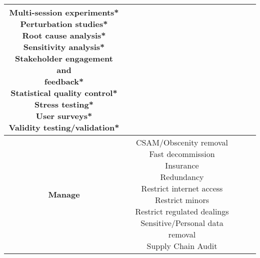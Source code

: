 \documentclass[fleqn]{article}
\begin{document}
\begin{landscape}
\begin{table}[H]
\begin{tabular}{|c|c|c|c|}
{			\textbullet\hspace{3pt} Multi-session experiments*\\  		
			\textbullet\hspace{3pt} Perturbation studies*\\  				
			\textbullet\hspace{3pt} Root cause analysis*\\  	
			\textbullet\hspace{3pt} Sensitivity analysis*\\  	
			\textbullet\hspace{3pt} Stakeholder engagement and \\\hspace{10pt}feedback*\\  	
			\textbullet\hspace{3pt} Statistical quality control*\\  	
			\textbullet\hspace{3pt} Stress testing*\\  		
			\textbullet\hspace{3pt} User surveys*\\  	
			\textbullet\hspace{3pt} Validity testing/validation*\\ 
		}
		\\
		\hline		
		\textbf{Manage} & \makecell[l]{	
			\textbullet\hspace{3pt} CSAM/Obscenity removal \\ 	
			\textbullet\hspace{3pt} Fast decommission \\ 	
			\textbullet\hspace{3pt} Insurance \\ 	
			\textbullet\hspace{3pt} Redundancy \\ 	
			\textbullet\hspace{3pt} Restrict internet access \\ 	
			\textbullet\hspace{3pt} Restrict minors \\ 	
			\textbullet\hspace{3pt} Restrict regulated dealings \\ 	
			\textbullet\hspace{3pt} Sensitive/Personal data removal \\ 	
			\textbullet\hspace{3pt} Supply Chain Audit \\ 	
}
\end{tabular}
\end{table}
\end{landscape}
\end{document}
